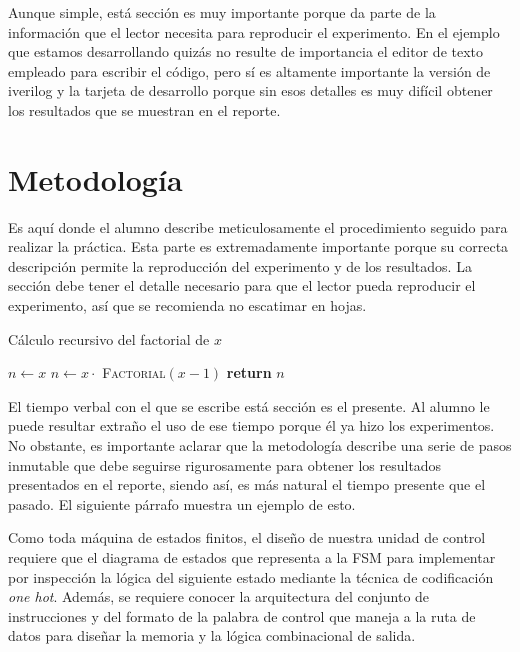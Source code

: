 \documentclass[10pt, twocolumn]{article}
\begin{document}
Aunque simple, está sección es muy importante porque da parte de la información que el lector necesita para reproducir el experimento. En el ejemplo que estamos desarrollando quizás no resulte de importancia el editor de texto empleado para escribir el código, pero sí es altamente importante la versión de iverilog y la tarjeta de desarrollo porque sin esos detalles es muy difícil obtener los resultados que se muestran en el reporte.

\section{Metodología}\label{sec:methodology}

Es aquí donde el alumno describe meticulosamente el procedimiento seguido para realizar la práctica. Esta parte es extremadamente importante porque su correcta descripción permite la reproducción del experimento y de los resultados. La sección debe tener el detalle necesario para que el lector pueda reproducir el experimento, así que se recomienda no escatimar en hojas.

\begin{center}
    \begin{minipage}{0.4\textwidth}
        \begin{algorithm}[H]
            \caption{Cálculo recursivo del factorial de $x$}\label{alg:factorial}
            \begin{algorithmic}[1]
                    \State $n \gets x$
                \Else
                    \State $n \gets x \cdot $ \textsc{Factorial}$(x-1)$
                \EndIf
                \State \textbf{return} $n$
                \EndProcedure
            \end{algorithmic}
        \end{algorithm}
    \end{minipage}
\end{center}

El tiempo verbal con el que se escribe está sección es el presente. Al alumno le puede resultar extraño el uso de ese tiempo porque él ya hizo los experimentos. No obstante, es importante aclarar que la metodología describe una serie de pasos inmutable que debe seguirse rigurosamente para obtener los resultados presentados en el reporte, siendo así, es más natural el tiempo presente que el pasado. El siguiente párrafo muestra un ejemplo de esto.

Como toda máquina de estados finitos, el diseño de nuestra unidad de control requiere que el diagrama de estados que representa a la FSM para implementar por inspección la lógica del siguiente estado mediante la técnica de codificación \textit{one hot}. Además, se requiere conocer la arquitectura del conjunto de instrucciones y del formato de la palabra de control que maneja a la ruta de datos para diseñar la memoria y la lógica combinacional de salida.
\end{document}
